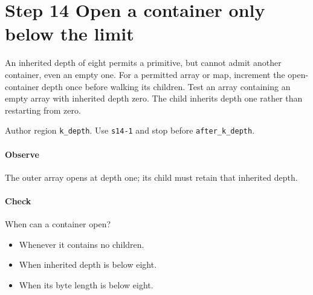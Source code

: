 \section{Step 14 Open a container only below the limit}\label{cbor-s14}
An inherited depth of eight permits a primitive, but cannot admit another container, even an empty one. For a permitted array or map, increment the open-container depth once before walking its children. Test an array containing an empty array with inherited depth zero. The child inherits depth one rather than restarting from zero.

Author region \texttt{k\_depth}. Use \texttt{s14-1} and stop before \texttt{after\_k\_depth}.

\paragraph{Observe} The outer array opens at depth one; its child must retain that inherited depth.

\paragraph{Check} When can a container open?
\begin{itemize}
  \item[A.] Whenever it contains no children.
  \item[B.] When inherited depth is below eight.
  \item[C.] When its byte length is below eight.
\end{itemize}
